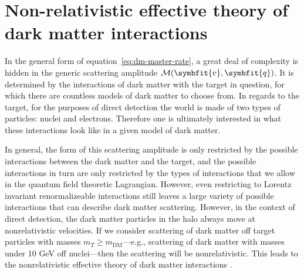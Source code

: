 \documentclass[b5paper, 10pt, twoside]{book}
\renewcommand{\vec}[1]{\symbfit{#1}}
\begin{document}
\section{Non-relativistic effective theory of dark matter interactions}
\label{chap:eft}

In the general form of equation~\eqref{eq:dm-master-rate}, a great deal of complexity is hidden in the generic scattering amplitude $\mathcal{M}(\vec{v},\vec{q})$. It is determined by the interactions of dark matter with the target in question, for which there are countless models of dark matter to choose from. In regards to the target, for the purposes of direct detection the world is made of two types of particles: nuclei and electrons. Therefore one is ultimately interested in what these interactions look like in a given model of dark matter.


In general, the form of this scattering amplitude is only restricted by the possible interactions between the dark matter and the target, and the possible interactions in turn are only restricted by the types of interactions that we allow in the quantum field theoretic Lagrangian. However, even restricting to Lorentz invariant renormalizeable interactions still leaves a large variety of possible interactions that can describe dark matter scattering. However, in the context of direct detection, the dark matter particles in the halo always move at nonrelativistic velocities. If we consider scattering of dark matter off target particles with masses $m_T\geq m_\text{DM}$---e.g., scattering of dark matter with masses under 10 GeV off nuclei---then the scattering will be nonrelativistic. This leads to the nonrelativistic effective theory of dark matter interactions \parencite{FitzpatrickEtAl2013}.
\end{document}
